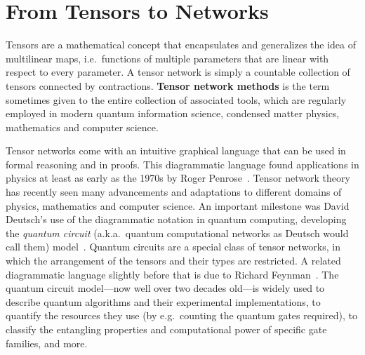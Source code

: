 \part{From Tensors to Networks}
\label{sec:tensor}

Tensors are a mathematical concept that encapsulates and generalizes the idea of
multilinear maps, i.e.~functions of multiple parameters that are linear with respect to every parameter.
A tensor network is simply a countable collection of tensors connected by contractions.
{\bf Tensor network methods} is the term sometimes given to the entire collection of associated tools, which are regularly employed in modern quantum information science, condensed matter physics, mathematics and computer science.  
 
Tensor networks come with an intuitive graphical language that can be used in formal reasoning and in proofs. 
This diagrammatic language found applications in physics at least as early as the 1970s by Roger Penrose~\cite{Penrose}.
Tensor network theory has recently seen many advancements and adaptations to different domains of physics, mathematics and computer science.
An important milestone was David Deutsch's use of the diagrammatic notation in quantum computing,
developing the \emph{quantum circuit} (a.k.a.~quantum computational networks as Deutsch would call them)
model~\cite{Deutsch73}.
Quantum circuits are a special class of tensor networks, in which the arrangement of the tensors and their types are restricted.
A related diagrammatic language slightly before that is due to Richard Feynman~\cite{Fey86}.
The quantum circuit model---now well over two decades old---is widely used
to describe quantum algorithms and their experimental implementations,
to quantify the resources they use (by e.g.~counting the quantum gates required),
to classify the entangling properties and computational power of specific gate families, and more.

